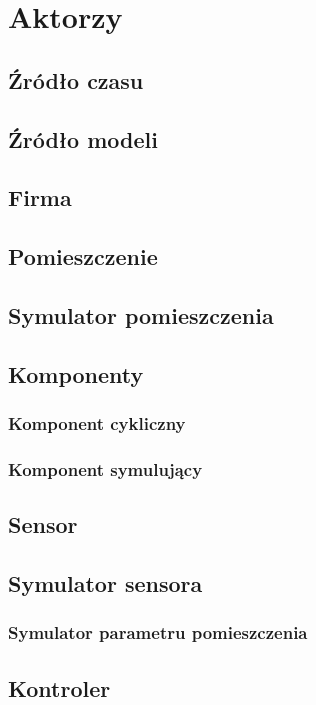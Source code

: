 \chapter{Aktorzy}
\section{Źródło czasu}
\section{Źródło modeli}
\section{Firma}
\section{Pomieszczenie}
\section{Symulator pomieszczenia}

\section{Komponenty}
\subsection{Komponent cykliczny}
\subsection{Komponent symulujący}
\section{Sensor}
\section{Symulator sensora}
\subsection{Symulator parametru pomieszczenia}
\section{Kontroler}